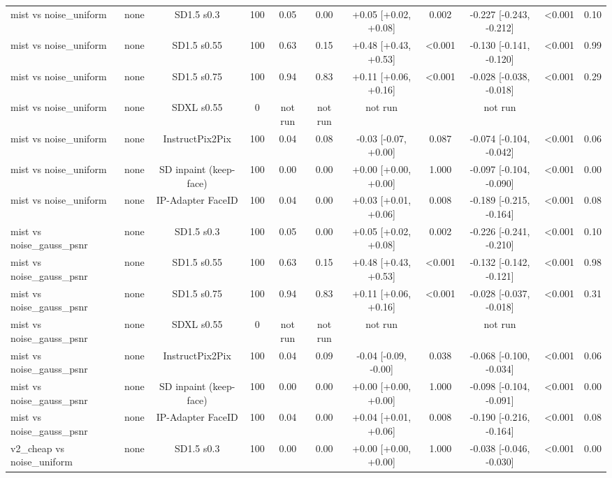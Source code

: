 \begin{table}[t]
{\begin{tabular}{lcccccccccc}
mist vs noise\_uniform & none & SD1.5 s0.3 & 100 & 0.05 & 0.00 & +0.05 [+0.02, +0.08] & 0.002 & -0.227 [-0.243, -0.212] & <0.001 & 0.10 \\
mist vs noise\_uniform & none & SD1.5 s0.55 & 100 & 0.63 & 0.15 & +0.48 [+0.43, +0.53] & <0.001 & -0.130 [-0.141, -0.120] & <0.001 & 0.99 \\
mist vs noise\_uniform & none & SD1.5 s0.75 & 100 & 0.94 & 0.83 & +0.11 [+0.06, +0.16] & <0.001 & -0.028 [-0.038, -0.018] & <0.001 & 0.29 \\
mist vs noise\_uniform & none & SDXL s0.55 & 0 & not run & not run & not run &  & not run &  &  \\
mist vs noise\_uniform & none & InstructPix2Pix & 100 & 0.04 & 0.08 & -0.03 [-0.07, +0.00] & 0.087 & -0.074 [-0.104, -0.042] & <0.001 & 0.06 \\
mist vs noise\_uniform & none & SD inpaint (keep-face) & 100 & 0.00 & 0.00 & +0.00 [+0.00, +0.00] & 1.000 & -0.097 [-0.104, -0.090] & <0.001 & 0.00 \\
mist vs noise\_uniform & none & IP-Adapter FaceID & 100 & 0.04 & 0.00 & +0.03 [+0.01, +0.06] & 0.008 & -0.189 [-0.215, -0.164] & <0.001 & 0.08 \\
mist vs noise\_gauss\_psnr & none & SD1.5 s0.3 & 100 & 0.05 & 0.00 & +0.05 [+0.02, +0.08] & 0.002 & -0.226 [-0.241, -0.210] & <0.001 & 0.10 \\
mist vs noise\_gauss\_psnr & none & SD1.5 s0.55 & 100 & 0.63 & 0.15 & +0.48 [+0.43, +0.53] & <0.001 & -0.132 [-0.142, -0.121] & <0.001 & 0.98 \\
mist vs noise\_gauss\_psnr & none & SD1.5 s0.75 & 100 & 0.94 & 0.83 & +0.11 [+0.06, +0.16] & <0.001 & -0.028 [-0.037, -0.018] & <0.001 & 0.31 \\
mist vs noise\_gauss\_psnr & none & SDXL s0.55 & 0 & not run & not run & not run &  & not run &  &  \\
mist vs noise\_gauss\_psnr & none & InstructPix2Pix & 100 & 0.04 & 0.09 & -0.04 [-0.09, -0.00] & 0.038 & -0.068 [-0.100, -0.034] & <0.001 & 0.06 \\
mist vs noise\_gauss\_psnr & none & SD inpaint (keep-face) & 100 & 0.00 & 0.00 & +0.00 [+0.00, +0.00] & 1.000 & -0.098 [-0.104, -0.091] & <0.001 & 0.00 \\
mist vs noise\_gauss\_psnr & none & IP-Adapter FaceID & 100 & 0.04 & 0.00 & +0.04 [+0.01, +0.06] & 0.008 & -0.190 [-0.216, -0.164] & <0.001 & 0.08 \\
v2\_cheap vs noise\_uniform & none & SD1.5 s0.3 & 100 & 0.00 & 0.00 & +0.00 [+0.00, +0.00] & 1.000 & -0.038 [-0.046, -0.030] & <0.001 & 0.00 \\

\end{tabular}}
\end{table}

